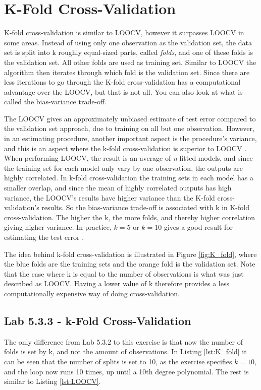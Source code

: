 \section{K-Fold Cross-Validation}
K-fold cross-validation is similar to LOOCV, however it surpasses LOOCV in some areas. Instead of using only one observation as the validation set, the  data set is split into k roughly equal-sized parts, called \emph{folds}, and one of these folds is the validation set. All other folds are used as training set. Similar to LOOCV the algorithm then iterates through which fold is the validation set. Since there are less iterations to go through the K-fold cross-validation has a computational advantage over the LOOCV, but that is not all. You can also look at what is called the bias-variance trade-off. 

The LOOCV gives an approximately unbiased estimate of test error compared to the validation set approach, due to training on all but one observation. However, in an estimating procedure, another important aspect is the procedure's variance, and this is an aspect where the k-fold cross-validation is superior to LOOCV \citep[pp. 304-305]{datamining}. When performing LOOCV, the result is an average of \emph{n} fitted models, and since the training set for each model only vary by one observation, the outputs are highly correlated. In k-fold cross-validation the training sets in each model has a smaller overlap, and since the mean of highly correlated outputs has high variance, the LOOCV's results have higher variance than the K-fold cross-validation's results. So the bias-variance trade-off is associated with k in K-fold cross-validation. The higher the k, the more folds, and thereby higher correlation giving higher variance. In practice, $k=5$ or $k=10$ gives a good result for estimating the test error \citep[pp. 183]{ISLR} \citep[pp. 54]{AIbook}.


The idea behind k-fold cross-validation is illustrated in Figure \ref{fig:K_fold}, where the blue folds are the training sets and the orange fold is the validation set. Note that the case where k is equal to the number of observations is what was just described as LOOCV. Having a lower value of k therefore provides a less computationally expensive way of doing cross-validation.

\FloatBarrier
\subsection{Lab 5.3.3 - k-Fold Cross-Validation}
The only difference from Lab 5.3.2 to this exercise is that now the number of folds is set by k, and not the amount of observations. In Listing \ref{lst:K_fold} it can be seen that the number of splits is set to 10, as the exercise specifies $k=10$, and the loop now runs 10 times, up until a 10th degree polynomial. The rest is similar to Listing \ref{lst:LOOCV}.

